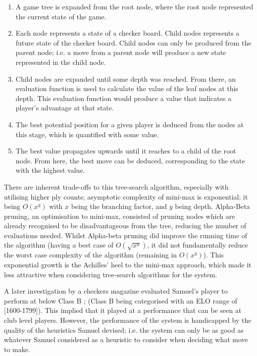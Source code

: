 \documentclass[12pt,a4paper]{article}
\begin{document}
        \begin{enumerate}
            \item A game tree is expanded from the root node, where the root node represented the current state of the game.
            \item Each node represents a state of a checker board. Child nodes represents a future state of the checker board. Child nodes can only be produced from the parent node; i.e. a move from a parent node will produce a new state represented in the child node.
            \item Child nodes are expanded until some depth was reached. From there, an evaluation function is used to calculate the value of the leaf nodes at this depth. This evaluation function would produce a value that indicates a player's advantage at that state.
            \item The best potential position for a given player is deduced from the nodes at this stage, which is quantified with some value.
            \item The best value propagates upwards until it reaches to a child of the root node. From here, the best move can be deduced, corresponding to the state with the highest value.
        \end{enumerate}

        There are inherent trade-offs to this tree-search algorithm, especially with utilising higher ply counts; asymptotic complexity of mini-max is exponential; it being $O(x^y)$ with $x$ being the branching factor, and $y$ being depth. Alpha-Beta pruning, an optimisation to mini-max, consisted of pruning nodes which are already recognised to be disadvantageous from the tree, reducing the number of evaluations needed. Whilst Alpha-beta pruning did improve the running time of the algorithm (having a best case of $O(\sqrt{x^y})$, it did not fundamentally reduce the worst case complexity of the algorithm (remaining in $O(x^y)$). This exponential growth is the Achilles' heel to the mini-max approach, which made it less attractive when considering tree-search algorithms for the system.

        A later investigation by a checkers magazine evaluated Samuel's player to perform at below Class B \cite{schaeffer_one_1997,fogel_evolving_2000}; (Class B being categorised with an ELO range of [1600-1799]). This implied that it played at a performance that can be seen at club level players. \cite{elo_rating_2008} However, the performance of the system is handicapped by the quality of the heuristics Samuel devised; i.e. the system can only be as good as whatever Samuel considered as a heuristic to consider when deciding what move to make.
\end{document}
